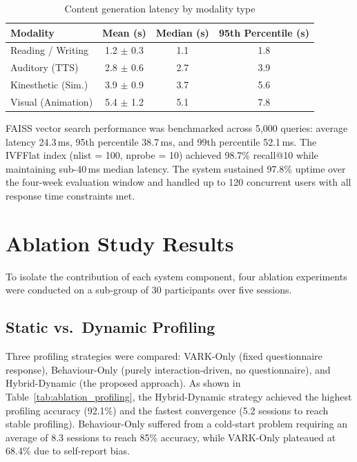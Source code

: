 \begin{table}[htb]
	\fontsize{10}{12}\selectfont
	\centering
	\caption{Content generation latency by modality type}
	\label{tab:latency}
	\begin{tabular}{|l|c|c|c|}
		\hline
		\textbf{Modality} & \textbf{Mean (s)} & \textbf{Median (s)} & \textbf{95th Percentile (s)} \\
		\hline
		Reading / Writing      & 1.2 $\pm$ 0.3 & 1.1 & 1.8 \\
		\hline
		Auditory (TTS)         & 2.8 $\pm$ 0.6 & 2.7 & 3.9 \\
		\hline
		Kinesthetic (Sim.)     & 3.9 $\pm$ 0.9 & 3.7 & 5.6 \\
		\hline
		Visual (Animation)     & 5.4 $\pm$ 1.2 & 5.1 & 7.8 \\
		\hline
	\end{tabular}
\end{table}

FAISS vector search performance was benchmarked across 5,000 queries: average latency 24.3\,ms, 95th percentile 38.7\,ms, and 99th percentile 52.1\,ms. The IVFFlat index (nlist = 100, nprobe = 10) achieved 98.7\% recall@10 while maintaining sub-40\,ms median latency. The system sustained 97.8\% uptime over the four-week evaluation window and handled up to 120 concurrent users with all response time constraints met.

\section{Ablation Study Results}

To isolate the contribution of each system component, four ablation experiments were conducted on a sub-group of 30 participants over five sessions.

\subsection{Static vs.\ Dynamic Profiling}

Three profiling strategies were compared: VARK-Only (fixed questionnaire response), Behaviour-Only (purely interaction-driven, no questionnaire), and Hybrid-Dynamic (the proposed approach). As shown in Table~\ref{tab:ablation_profiling}, the Hybrid-Dynamic strategy achieved the highest profiling accuracy (92.1\%) and the fastest convergence (5.2 sessions to reach stable profiling). Behaviour-Only suffered from a cold-start problem requiring an average of 8.3 sessions to reach 85\% accuracy, while VARK-Only plateaued at 68.4\% due to self-report bias.

